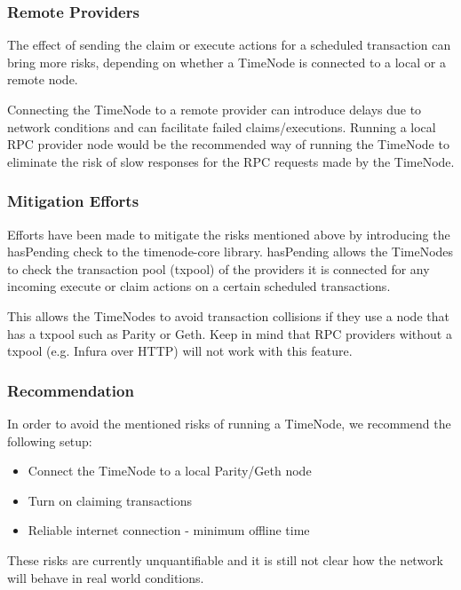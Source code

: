 \documentclass{article}
\begin{document}
{  \subsubsection{Remote Providers}
  The effect of sending the claim or execute actions for a scheduled transaction can bring more risks, depending on whether a TimeNode is connected to a local or a remote node.
  
  Connecting the TimeNode to a remote provider can introduce delays due to network conditions and can facilitate failed claims/executions. Running a local RPC provider node would be the recommended way of running the TimeNode to eliminate the risk of slow responses for the RPC requests made by the TimeNode.
  \subsubsection{Mitigation Efforts}
  Efforts have been made to mitigate the risks mentioned above by introducing the hasPending check to the timenode-core library. hasPending allows the TimeNodes to check the transaction pool (txpool) of the providers it is connected for any incoming execute or claim actions on a certain scheduled transactions.

  This allows the TimeNodes to avoid transaction collisions if they use a node that has a txpool such as Parity or Geth. Keep in mind that RPC providers without a txpool (e.g. Infura over HTTP) will not work with this feature.

  \subsubsection{Recommendation}
  In order to avoid the mentioned risks of running a TimeNode, we recommend the following setup:
  \begin{itemize}
    \item Connect the TimeNode to a local Parity/Geth node
    \item Turn on claiming transactions
    \item Reliable internet connection - minimum offline time
  \end{itemize}

  These risks are currently unquantifiable and it is still not clear how the network will behave in real world conditions.

}
\end{document}
